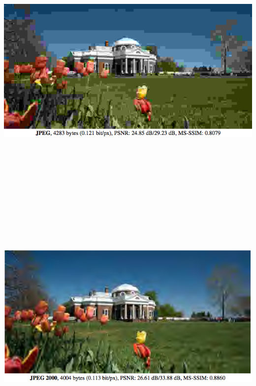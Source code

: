 {\bigskip
\centerline{\includegraphics[height=5in]{../images/RateDist2}}


\bigskip
\centerline{\includegraphics[height= 5in]{../images/RateDist3}}

}

